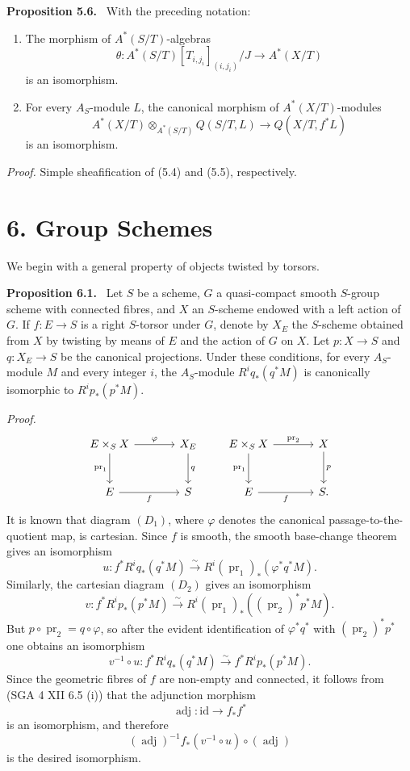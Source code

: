\documentclass[11pt]{article}
\newenvironment{statement}[1]{\par\medskip\noindent\textbf{#1.}\ }{\par\medskip}
\providecommand{\pr}{\operatorname{pr}}
\providecommand{\pr}{\operatorname{pr}}
\begin{document}
\begin{statement}{Proposition 5.6}
With the preceding notation:
\begin{enumerate}[label=\alph*)]
\item The morphism of $A^*(S/T)$-algebras
\[
\theta:A^*(S/T)[T_{i,j_i}]_{(i,j_i)}/J\to A^*(X/T)
\]
is an isomorphism.
\item For every $A_S$-module $L$, the canonical morphism of $A^*(X/T)$-modules
\[
A^*(X/T)\otimes_{A^*(S/T)}Q(S/T,L)\to Q(X/T,f^*L)
\]
is an isomorphism.
\end{enumerate}
\end{statement}

\emph{Proof.} Simple sheafification of (5.4) and (5.5), respectively.

\section*{6. Group Schemes}

We begin with a general property of objects twisted by torsors.

\begin{statement}{Proposition 6.1}
Let $S$ be a scheme, $G$ a quasi-compact smooth $S$-group scheme with connected fibres, and $X$ an $S$-scheme endowed with a left action of $G$. If $f:E\to S$ is a right $S$-torsor under $G$, denote by $X_E$ the $S$-scheme obtained from $X$ by twisting by means of $E$ and the action of $G$ on $X$. Let $p:X\to S$ and $q:X_E\to S$ be the canonical projections. Under these conditions, for every $A_S$-module $M$ and every integer $i$, the $A_S$-module $R^iq_*(q^*M)$ is canonically isomorphic to $R^ip_*(p^*M)$.
\end{statement}

\emph{Proof.}
\[
\begin{tikzcd}[column sep=large,row sep=large]
E\times_S X \arrow[r,"\varphi"] \arrow[d,"\pr_1"'] & X_E \arrow[d,"q"]\\
E \arrow[r,"f"'] & S
\end{tikzcd}
\qquad
\begin{tikzcd}[column sep=large,row sep=large]
E\times_S X \arrow[r,"\pr_2"] \arrow[d,"\pr_1"'] & X \arrow[d,"p"]\\
E \arrow[r,"f"'] & S .
\end{tikzcd}
\]
It is known that diagram $(D_1)$, where $\varphi$ denotes the canonical passage-to-the-quotient map, is cartesian. Since $f$ is smooth, the smooth base-change theorem gives an isomorphism
\[
u:f^*R^iq_*(q^*M)\xrightarrow{\sim}R^i(\pr_1)_*(\varphi^*q^*M).
\]
Similarly, the cartesian diagram $(D_2)$ gives an isomorphism
\[
v:f^*R^ip_*(p^*M)\xrightarrow{\sim}R^i(\pr_1)_*((\pr_2)^*p^*M).
\]
But $p\circ\pr_2=q\circ\varphi$, so after the evident identification of $\varphi^*q^*$ with $(\pr_2)^*p^*$ one obtains an isomorphism
\[
v^{-1}\circ u:f^*R^iq_*(q^*M)\xrightarrow{\sim} f^*R^ip_*(p^*M).
\]
Since the geometric fibres of $f$ are non-empty and connected, it follows from (SGA 4 XII 6.5 (i)) that the adjunction morphism
\[
\operatorname{adj}:\mathrm{id}\to f_*f^*
\]
is an isomorphism, and therefore
\[
(\operatorname{adj})^{-1} f_*(v^{-1}\circ u)\circ(\operatorname{adj})
\]
is the desired isomorphism.
\end{document}
